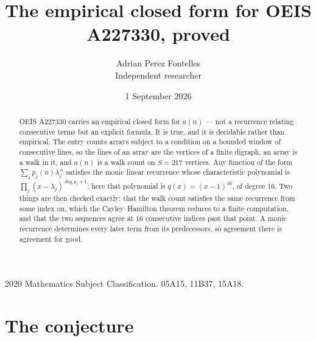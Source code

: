 \documentclass[11pt,a4paper]{article}
\title{The empirical closed form for OEIS A227330, proved}
\author{Adrian Perez Fontelles\\ \small Independent researcher}
\date{1 September 2026}
\theoremstyle{plain}
\theoremstyle{definition}
\begin{document}
\maketitle

\begin{abstract}
OEIS A227330 carries an empirical closed form for $a(n)$ --- not a recurrence relating
consecutive terms but an explicit formula. It is true, and it is decidable rather than
empirical. The entry counts arrays subject to a condition on a bounded window of consecutive lines, so the lines of an array are the
vertices of a finite digraph, an array is a walk in it, and $a(n)$ is a walk count on
$S=217$ vertices. Any function of the form $\sum_j p_j(n)\lambda_j^{\,n}$ satisfies the
monic linear recurrence whose characteristic polynomial is
$\prod_j(x-\lambda_j)^{\deg p_j+1}$; here that polynomial is $q(x)=(x-1)^{16}$, of degree
$16$. Two things are then checked exactly: that the walk count satisfies the same
recurrence from some index on, which the Cayley--Hamilton theorem reduces to a finite
computation, and that the two sequences agree at $16$ consecutive indices past that
point. A monic recurrence determines every later term from its predecessors, so agreement
there is agreement for good.
\end{abstract}

\noindent\small 2020 Mathematics Subject Classification. 05A15, 11B37, 15A18.\normalsize

\section{The conjecture}
\end{document}
